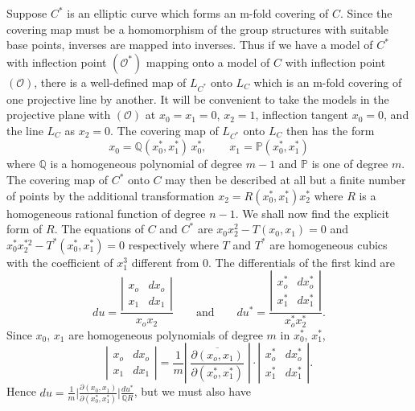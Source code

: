 Suppose $C^{*}$ is an elliptic curve which forms an m-fold covering of
$C$. Since the covering map must be a homomorphism of the group
structures with suitable base points, inverses are mapped into inverses.
Thus if we have a model of $C^{*}$ with inflection point
$(\mathcal{O}^{*})$ mapping onto a model of $C$ with inflection point
$(\mathcal{O})$, there is a well-defined map of $L_{C^{*}}$ onto $L_{C}$
which is an m-fold covering of one projective line by another. It will
be convenient to take the models in the projective plane with
$(\mathcal{O})$ at $x_{0}=x_{1}=0$, $x_{2}=1$, inflection tangent
$x_{0}=0$, and the line $L_{C}$ as $x_{2}=0$. The covering map of
$L_{C^{*}}$ onto $L_{C}$ then has the form
\[
x_{0}=\mathbb{Q}(x_{0}^{*},x_{1}^{*})\,x_{0}^{*},\qquad
x_{1}=\mathbb{P}(x_{0}^{*},x_{1}^{*})
\]
where $\mathbb{Q}$ is a homogeneous polynomial of degree $m-1$ and
$\mathbb{P}$ is one of degree $m$. The covering map of $C^{*}$ onto $C$
may then be described at all but a finite number of points by the
additional transformation $x_{2}=R(x_{0}^{*},x_{1}^{*})x_{2}^{*}$ where
$R$ is a homogeneous rational function of degree $n-1$. We shall now
find the explicit form of $R$. The equations of $C$ and $C^{*}$ are
$x_{0}x_{2}^{2}-T(x_{0},x_{1})=0$ and
$x_{0}^{*}x_{2}^{*2}-T^{*}(x_{0}^{*},x_{1}^{*})=0$ respectively where $T$
and $T^{*}$ are homogeneous cubics with the coefficient of $x_{1}^{3}$
different from $0$. The differentials of the first kind are
\[
du=\frac{\left|\begin{array}{cc}x_{o}&dx_{o}\\ x_{1}&dx_{1}\end{array}\right|}
{x_{o}x_{2}}
\qquad\text{and}\qquad
du^{*}=\frac{\left|\begin{array}{cc}x_{o}^{*}&dx_{o}^{*}\\
x_{1}^{*}&dx_{1}^{*}\end{array}\right|}{x_{o}^{*}x_{2}^{*}}.
\]
Since $x_{0}$, $x_{1}$ are homogeneous polynomials of degree $m$ in
$x_{0}^{*}$, $x_{1}^{*}$,
\[
\left|\begin{array}{cc}x_{o}&dx_{o}\\ x_{1}&dx_{1}\end{array}\right|
=\frac{1}{m}\left|\;\overline{\frac{\partial(x_{o},x_{1})}
{\partial(x_{o}^{*},x_{1}^{*})}}\;\right|\cdot
\left|\begin{array}{cc}x_{o}^{*}&dx_{o}^{*}\\ x_{1}^{*}&dx_{1}^{*}
\end{array}\right|.
\]
Hence
$du=\frac{1}{m}\bigl|\frac{\partial(x_{0},x_{1})}{\partial(x_{0}^{*},
x_{1}^{*})}\bigr|\frac{du^{*}}{\mathbb{Q}R}$, but we must also have
